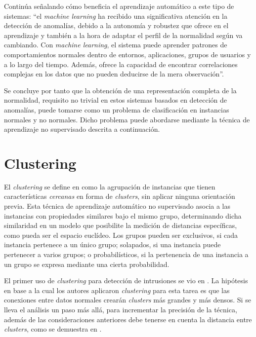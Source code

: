 Continúa señalando cómo beneficia el aprendizaje automático a este tipo de sistemas: ``el \emph{machine learning} ha recibido una significativa atención en la detección de anomalías, debido a
la autonomía y robustez que ofrece en el aprendizaje y también a la hora de adaptar el perfil de la normalidad según va cambiando.
Con \emph{machine learning}, el sistema puede aprender patrones de comportamientos normales dentro de entornos, aplicaciones, grupos de usuarios y a lo largo del tiempo.
Además, ofrece la capacidad de encontrar correlaciones complejas en los datos que no pueden deducirse de la mera observación''.

Se concluye por tanto que la obtención de una representación completa de la normalidad, requisito no trivial en estos sistemas basados en detección de anomalías,
puede tomarse como un problema de clasificación en instancias normales y no normales.
Dicho problema puede abordarse mediante la técnica de aprendizaje no supervisado descrita a continuación.

\section{Clustering}\label{clustering}

El \emph{clustering} se define en \cite{NA08} como la agrupación de instancias que tienen características \emph{cercanas} en forma de \emph{clusters}, sin aplicar ninguna orientación previa.
Esta técnica de aprendizaje automático no supervisado asocia a las instancias con propiedades similares bajo el mismo grupo,
determinando dicha similaridad en un modelo que posibilite la medición de distancias específicas, como pueda ser el espacio euclídeo.
Los grupos pueden ser exclusivos, si cada instancia pertenece a un único grupo;
solapados, si una instancia puede pertenecer a varios grupos;
o probabilísticos, si la pertenencia de una instancia a un grupo se expresa mediante una cierta probabilidad.

El primer uso de \emph{clustering} para detección de intrusiones se vio en \cite{Portnoy_2000}.
La hipótesis en base a la cual los autores aplicaron \emph{clustering} para esta tarea es que las conexiones entre datos normales crearán \emph{clusters} más grandes y más densos.
Si se lleva el análisis un paso más allá, para incrementar la precisión de la técnica, además de las consideraciones anteriores
debe tenerse en cuenta la distancia entre \emph{clusters}, como se demuestra en \cite{JSW+06}.

